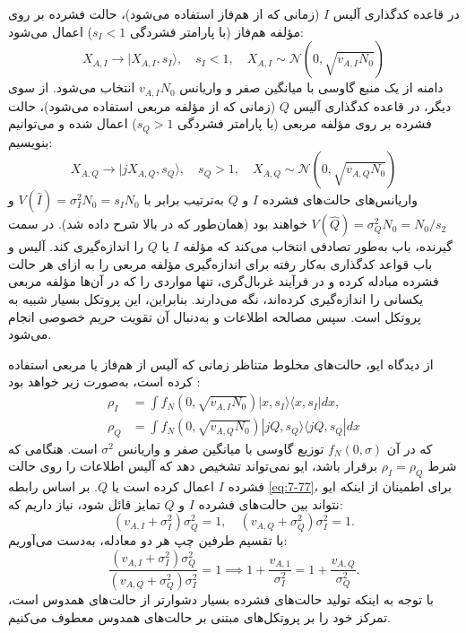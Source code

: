 در قاعده کدگذاری آلیس $I$ (زمانی که از  هم‌فاز استفاده می‌شود)، حالت فشرده بر روی مؤلفه هم‌فاز (با پارامتر فشردگی $s_I < 1$) اعمال می‌شود:
\begin{equation}
	X_{A,I} \rightarrow |X_{A,I}, s_I \rangle, \quad s_I < 1, \quad X_{A,I} \sim \mathcal{N}(0, \sqrt{v_{A,I} N_0})
	\label{eq:7-103}
\end{equation}
دامنه از یک منبع گاوسی با میانگین صفر و واریانس $v_{A,I} N_0$ انتخاب می‌شود. از سوی دیگر، در قاعده کدگذاری آلیس $Q$ (زمانی که از مؤلفه مربعی استفاده می‌شود)، حالت فشرده بر روی مؤلفه مربعی (با پارامتر فشردگی $s_Q > 1$) اعمال شده و می‌توانیم بنویسیم:
\begin{equation}
	X_{A,Q} \rightarrow |jX_{A,Q}, s_Q \rangle, \quad s_Q > 1, \quad X_{A,Q} \sim \mathcal{N}(0, \sqrt{v_{A,Q} N_0})
	\label{eq:7-104}
\end{equation}
واریانس‌های حالت‌های فشرده $I$ و $Q$ به‌ترتیب برابر با $V(\hat{I}) = \sigma_I^2 N_0 = s_I N_0$ و $V(\hat{Q}) = \sigma_Q^2 N_0 = N_0/s_2$ خواهند بود (همان‌طور که در بالا شرح داده شد). در سمت گیرنده، باب به‌طور تصادفی انتخاب می‌کند که مؤلفه $I$ یا $Q$ را اندازه‌گیری کند. آلیس و باب قواعد کدگذاری به‌کار رفته برای اندازه‌گیری مؤلفه مربعی را به ازای هر حالت فشرده مبادله کرده و در فرآیند غربال‌گری، تنها مواردی را که در آن‌ها مؤلفه مربعی یکسانی را اندازه‌گیری کرده‌اند، نگه می‌دارند. بنابراین، این پروتکل بسیار شبیه به پروتکل  است. سپس مصالحه اطلاعات و به‌دنبال آن تقویت حریم خصوصی انجام می‌شود.

از دیدگاه ایو، حالت‌های مخلوط متناظر زمانی که آلیس از  هم‌فاز یا مربعی استفاده کرده است، به‌صورت زیر خواهد بود \cite{7-7}:
\begin{equation}
	\begin{aligned}
		\rho_I &= \int f_N(0, \sqrt{v_{A,I} N_0}) |x, s_I \rangle \langle x, s_I| dx, \\
		\rho_Q &= \int f_N(0, \sqrt{v_{A,Q} N_0}) |jQ, s_Q \rangle \langle jQ, s_Q| dx
	\end{aligned}
	\label{eq:7-105}
\end{equation}
که در آن $f_N(0, \sigma)$ توزیع گاوسی با میانگین صفر و واریانس $\sigma^2$ است. هنگامی که شرط $\rho_I = \rho_Q$ برقرار باشد، ایو نمی‌تواند تشخیص دهد که آلیس اطلاعات را روی حالت فشرده $I$ اعمال کرده است یا $Q$. بر اساس رابطه \eqref{eq:7-77}، برای اطمینان از اینکه ایو نتواند بین حالت‌های فشرده $I$ و $Q$ تمایز قائل شود، نیاز داریم که:
\begin{equation}
	(v_{A,I} + \sigma_I^2)\sigma_Q^2 = 1, \quad (v_{A,Q} + \sigma_Q^2)\sigma_I^2 = 1.
	\label{eq:7-106}
\end{equation}
با تقسیم طرفین چپ هر دو معادله، به‌دست می‌آوریم:
\begin{equation}
	\frac{(v_{A,I} + \sigma_I^2)\sigma_Q^2}{(v_{A,Q} + \sigma_Q^2)\sigma_I^2} = 1 \implies 1 + \frac{v_{A,1}}{\sigma_I^2} = 1 + \frac{v_{A,Q}}{\sigma_Q^2}.
	\label{eq:7-107}
\end{equation}
با توجه به اینکه تولید حالت‌های فشرده بسیار دشوارتر از حالت‌های همدوس است، تمرکز خود را بر پروتکل‌های  مبتنی بر حالت‌های همدوس معطوف می‌کنیم.








